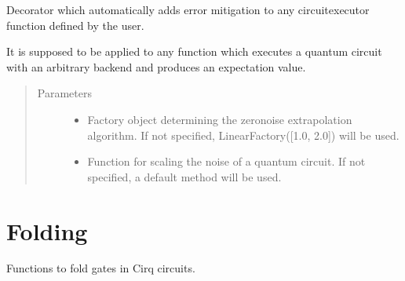 \documentclass[letterpaper,10pt,english]{sphinxmanual}
\begin{document}
\begin{fulllineitems}
\label{\detokenize{index:mitiq.zne.zne_decorator}}
Decorator which automatically adds error mitigation to any circuit\sphinxhyphen{}executor function
defined by the user.

It is supposed to be applied to any function which executes a quantum circuit
with an arbitrary backend and produces an expectation value.
\begin{quote}\begin{description}
\item[{Parameters}] \leavevmode\begin{itemize}
\item {} 
 \sphinxhyphen{}\sphinxhyphen{} Factory object determining the zero\sphinxhyphen{}noise extrapolation algorithm.
If not specified, LinearFactory({[}1.0, 2.0{]}) will be used.

\item {} 
 \sphinxhyphen{}\sphinxhyphen{} Function for scaling the noise of a quantum circuit.
If not specified, a default method will be used.

\end{itemize}

\end{description}\end{quote}

\end{fulllineitems}



\section{Folding}
\label{\detokenize{index:module-mitiq.folding_cirq}}\label{\detokenize{index:folding}}
Functions to fold gates in Cirq circuits.
\end{document}
